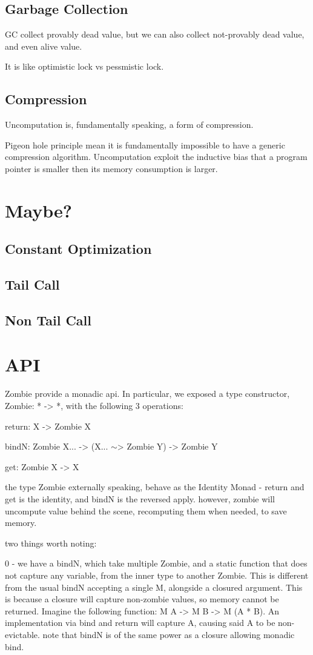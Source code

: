 \documentclass[acmsmall]{acmart}
\begin{document}
	\subsection{Garbage Collection}
	GC collect provably dead value, but we can also collect not-provably dead value, and even alive value.
	
	It is like optimistic lock vs pessmistic lock.
	\subsection{Compression}
	Uncomputation is, fundamentally speaking, a form of compression.
	
	Pigeon hole principle mean it is fundamentally impossible to have a generic compression algorithm. Uncomputation exploit the inductive bias that a program pointer is smaller then its memory consumption is larger.
	\section{Maybe?}
	\subsection{Constant Optimization}
	\subsection{Tail Call}
	\subsection{Non Tail Call}
	\section{API}
	Zombie provide a monadic api.
	In particular, we exposed a type constructor, Zombie: * -> *,
	with the following 3 operations:
	
	return: X -> Zombie X

	bindN: Zombie X... -> (X... $\sim$> Zombie Y) -> Zombie Y

	get: Zombie X -> X
	
	the type Zombie externally speaking, behave as the Identity Monad - return and get is the identity, and bindN is the reversed apply. however, zombie will uncompute value behind the scene, recomputing them when needed, to save memory.
	
	two things worth noting:
	
	0 - we have a bindN, which take multiple Zombie, and a static function that does not capture any variable, from the inner type to another Zombie. This is different from the usual bindN accepting a single M, alongside a closured argument. This is because a closure will capture non-zombie values, so memory cannot be returned. Imagine the following function: M A -> M B -> M (A * B). An implementation via bind and return will capture A, causing said A to be non-evictable. note that bindN is of the same power as a closure allowing monadic bind.
	
\end{document}
